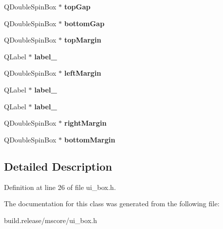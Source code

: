 \begin{DoxyCompactItemize}
Q\+Double\+Spin\+Box $\ast$ {\bfseries top\+Gap}
\item 
\mbox{\label{class_ui___box_base_a700f85b6907371a757d788a171060c4e}} 
Q\+Double\+Spin\+Box $\ast$ {\bfseries bottom\+Gap}
\item 
\mbox{\label{class_ui___box_base_a07e013c93ad771eb1e6db07c7cd1d009}} 
Q\+Double\+Spin\+Box $\ast$ {\bfseries top\+Margin}
\item 
\mbox{\label{class_ui___box_base_ab7102c6e84f5d79565efa8fc7874c4c5}} 
Q\+Label $\ast$ {\bfseries label\+\_}
\item 
\mbox{\label{class_ui___box_base_aaeca4a7ca477649c8e2ecd876bf97499}} 
Q\+Double\+Spin\+Box $\ast$ {\bfseries left\+Margin}
\item 
\mbox{\label{class_ui___box_base_a1d46745069c641176d7221099cd22fd8}} 
Q\+Label $\ast$ {\bfseries label\+\_}
\item 
\mbox{\label{class_ui___box_base_a4bb7d8962f2538daa3a89a5f6ce232e5}} 
Q\+Label $\ast$ {\bfseries label\+\_}
\item 
\mbox{\label{class_ui___box_base_ac3d606e136c2a8d4cf4190e61ef7f1fc}} 
Q\+Double\+Spin\+Box $\ast$ {\bfseries right\+Margin}
\item 
\mbox{\label{class_ui___box_base_afebe863376db93a4a652e69492dc438a}} 
Q\+Double\+Spin\+Box $\ast$ {\bfseries bottom\+Margin}
\end{DoxyCompactItemize}


\subsection{Detailed Description}


Definition at line 26 of file ui\+\_\+box.\+h.



The documentation for this class was generated from the following file\+:\begin{DoxyCompactItemize}
\item 
build.\+release/mscore/ui\+\_\+box.\+h\end{DoxyCompactItemize}
